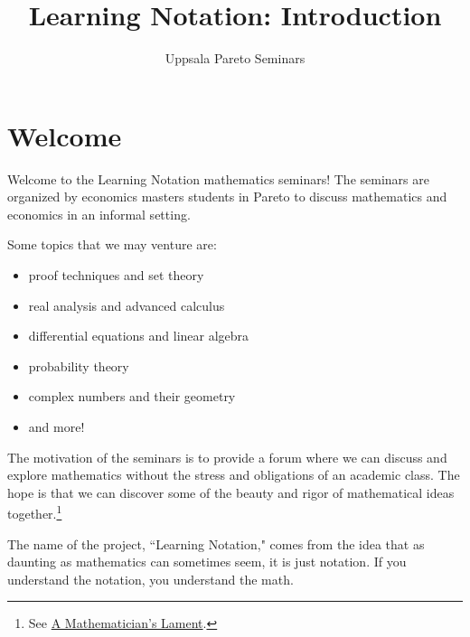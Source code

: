 \documentclass{article}[12pt]
\title{Learning Notation: Introduction}
\author{
    Uppsala Pareto Seminars
    }
\date{}
\begin{document}
    
    \maketitle %
        
    \section{Welcome} %
        
        Welcome to the Learning Notation mathematics seminars! The seminars are organized by economics masters students in Pareto to discuss mathematics and economics in an informal setting.
        
        Some topics that we may venture are:
        
        \begin{itemize}
            
            \item
            proof techniques and set theory
            
            \item
            real analysis and advanced calculus
            
            \item
            differential equations and linear algebra
            
            \item
            probability theory
            
            \item
            complex numbers and their geometry
            
            \item
            and more!
            
        \end{itemize}
        
        The motivation of the seminars is to provide a forum where we can discuss and explore mathematics without the stress and obligations of an academic class. The hope is that we can discover some of the beauty and rigor of mathematical ideas together.\footnote{See \href{https://www.maa.org/external_archive/devlin/LockhartsLament.pdf}{A Mathematician's Lament}.}
        
        The name of the project, ``Learning Notation," comes from the idea that as daunting as mathematics can sometimes seem, it is just notation. If you understand the notation, you understand the math.
        
\end{document}
